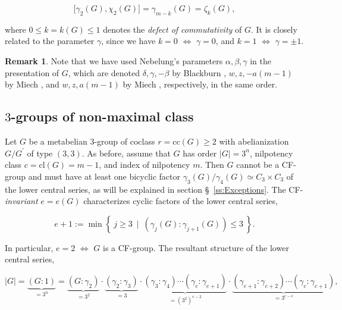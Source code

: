 \documentclass{amsart}
\theoremstyle{definition}
\newtheorem{remark}{Remark}[section]
\numberwithin{equation}{section}
\begin{document}
\begin{equation}
\label{eqn:DefectMax3}
\lbrack\gamma_2(G),\chi_2(G)\rbrack=\gamma_{m-k}(G)=\zeta_k(G),
\end{equation}

\noindent
where \(0\le k=k(G)\le 1\) denotes the \textit{defect of commutativity} of \(G\).
It is closely related to the parameter \(\gamma\), since we have
\(k=0\) \(\Longleftrightarrow\) \(\gamma=0\), and
\(k=1\) \(\Longleftrightarrow\) \(\gamma=\pm 1\).


\begin{remark}
\label{rmk:ParametrizedPresentation}
Note that we have used Nebelung's parameters \(\alpha,\beta,\gamma\)
in the presentation of \(G\), which are denoted
\(\delta,\gamma,-\beta\) by Blackburn
\cite[p. 82, (33), and p. 84, (36), (37)]{Bl},
\(w,z,-a(m-1)\) by Miech
\cite{Mi1},
and \(w,z,a(m-1)\) by Miech
\cite{Mi2},
respectively, in the same order.
\end{remark}



\subsection{\(3\)-groups of non-maximal class}
\label{ss:NonMaxClass3}

\noindent
Let \(G\) be a metabelian \(3\)-group of coclass \(r=\mathrm{cc}(G)\ge 2\)
with abelianization \(G/G^\prime\) of type \((3,3)\).
As before, assume that \(G\) has order \(\lvert G\rvert=3^n\),
nilpotency class \(c=\mathrm{cl}(G)=m-1\), and index of nilpotency \(m\).
Then \(G\) cannot be a CF-group and
must have at least one bicyclic factor
\(\gamma_3(G)/\gamma_4(G)\simeq C_3\times C_3\)
of the lower central series, as will be explained in section \S\
\ref{ss:Exceptions}.
The CF-\textit{invariant} \(e=e(G)\) characterizes cyclic factors of the lower central series,

\begin{equation}
\label{eqn:CFInvariant}
e+1:=\min\left\lbrace\ j\ge 3\ \mid\ \left(\gamma_j(G):\gamma_{j+1}(G)\right)\le 3\ \right\rbrace.
\end{equation}

\noindent
In particular, \(e=2\) \(\Longleftrightarrow\) \(G\) is a CF-group. The resultant structure of the lower central series,

\begin{equation}
\label{eqn:BFandCFofLowerCentral}
\lvert G\rvert=
\underbrace{(G:1)}_{=3^n}=
\underbrace{(G:\gamma_2)}_{=3^2}\cdot
\underbrace{(\gamma_2:\gamma_3)}_{=3}\cdot
\underbrace{(\gamma_3:\gamma_4)\cdots(\gamma_e:\gamma_{e+1})}_{=(3^2)^{e-2}}\cdot
\underbrace{(\gamma_{e+1}:\gamma_{e+2})\cdots(\gamma_c:\gamma_{c+1})}_{=3^{c-e}},
\end{equation}
\end{document}
